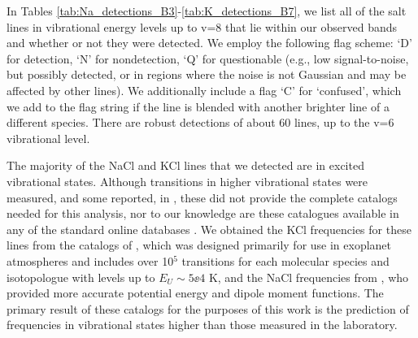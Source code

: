 \documentclass[twocolumn]{aastex62}
\newcommand{\rlp}[1]{\textcolor{red!65!black}{\textbf{[RLP: #1]}}}
\newcommand{\ag}[1]{\textcolor{red!65!black}{\textbf{[AG: #1]}}}
\begin{document}
In Tables \ref{tab:Na_detections_B3}-\ref{tab:K_detections_B7}, we list all
of the salt lines in vibrational energy levels up to v=8 that lie within our
observed bands and whether or not they were detected.  We employ the following
flag scheme: `D' for detection, `N' for nondetection, `Q' for questionable
(e.g., low signal-to-noise, but possibly detected, or in regions where the
noise is not Gaussian and may be affected by other lines).  We additionally
include a flag `C' for `confused', which we add to the flag string if the line
is blended with another brighter line of a different species.  There are robust
detections of about 60 lines, up to the v=6 vibrational level.

The majority of the NaCl and KCl lines that we detected are in excited
vibrational states.  Although transitions in higher vibrational states were
measured, and some reported, in \citet{Caris2004a}, these did not provide the
complete catalogs needed for this analysis, nor to our knowledge are these
catalogues available in any of the standard online databases \citep[i.e., CDMS,
SLAIM, JPL;][]{Muller2005a,Lovas2005b,Pickett1998a}.  We obtained the KCl
frequencies for these lines from the catalogs of \citet{Barton2014a}, which was
designed primarily for use in exoplanet atmospheres and includes over 10$^5$
transitions for each molecular species and isotopologue with levels up to
$E_U\sim5\ee{4}$ K, and the NaCl frequencies from \citet{Cabezas2016a}, who
provided more accurate potential energy and dipole moment functions. The
primary result of these catalogs for the purposes of this work is the
prediction of frequencies in vibrational states higher than those measured in
the laboratory. 


\end{document}
